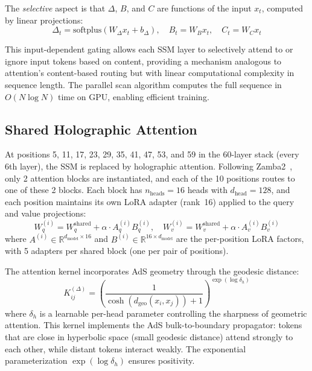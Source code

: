 \documentclass[11pt,a4paper,twocolumn]{article}
\begin{document}
The \emph{selective} aspect is that $\Delta$, $B$, and $C$ are functions of the input $x_t$, computed by linear projections:
\begin{equation}
\Delta_t = \mathrm{softplus}(W_\Delta x_t + b_\Delta), \quad B_t = W_B x_t, \quad C_t = W_C x_t
\label{eq:selective}
\end{equation}

This input-dependent gating allows each SSM layer to selectively attend to or ignore input tokens based on content, providing a mechanism analogous to attention's content-based routing but with linear computational complexity in sequence length.
The parallel scan algorithm computes the full sequence in $O(N \log N)$ time on GPU, enabling efficient training.

\subsection{Shared Holographic Attention}

At positions 5, 11, 17, 23, 29, 35, 41, 47, 53, and 59 in the 60-layer stack (every 6th layer), the SSM is replaced by holographic attention.
Following Zamba2~\cite{zamba2024}, only 2 attention blocks are instantiated, and each of the 10 positions routes to one of these 2 blocks.
Each block has $n_{\mathrm{heads}} = 16$ heads with $d_{\mathrm{head}} = 128$, and each position maintains its own LoRA adapter (rank~16) applied to the query and value projections:
\begin{equation}
W_q^{(i)} = W_q^{\mathrm{shared}} + \alpha \cdot A_q^{(i)} B_q^{(i)}, \quad W_v^{(i)} = W_v^{\mathrm{shared}} + \alpha \cdot A_v^{(i)} B_v^{(i)}
\label{eq:lora_attention}
\end{equation}
where $A^{(i)} \in \mathbb{R}^{d_{\mathrm{model}} \times 16}$ and $B^{(i)} \in \mathbb{R}^{16 \times d_{\mathrm{model}}}$ are the per-position LoRA factors, with 5 adapters per shared block (one per pair of positions).

The attention kernel incorporates AdS geometry through the geodesic distance:
\begin{equation}
K_{ij}^{(\Delta)} = \left(\frac{1}{\cosh(d_{\mathrm{geo}}(x_i, x_j)) + 1}\right)^{\exp(\log \delta_h)}
\label{eq:ads_kernel}
\end{equation}
where $\delta_h$ is a learnable per-head parameter controlling the sharpness of geometric attention.
This kernel implements the AdS bulk-to-boundary propagator: tokens that are close in hyperbolic space (small geodesic distance) attend strongly to each other, while distant tokens interact weakly.
The exponential parameterization $\exp(\log \delta_h)$ ensures positivity.
\end{document}
